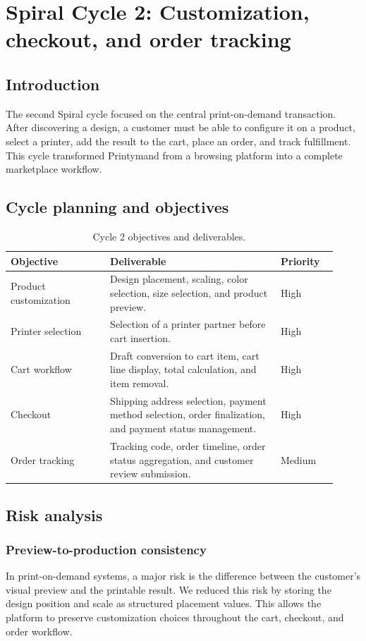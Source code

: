 \chapter{Spiral Cycle 2: Customization, checkout, and order tracking}
\label{ch::chapter5}

\section{Introduction}
The second Spiral cycle focused on the central print-on-demand transaction.
After discovering a design, a customer must be able to configure it on a product, select a printer, add the result to the cart, place an order, and track fulfillment.
This cycle transformed Printymand from a browsing platform into a complete marketplace workflow.

\section{Cycle planning and objectives}
\begin{table}[!htpb]
\caption{Cycle 2 objectives and deliverables.}
\centering
\begin{tabular}{|p{0.28\linewidth}|p{0.48\linewidth}|p{0.16\linewidth}|}
\hline
\textbf{Objective} & \textbf{Deliverable} & \textbf{Priority} \\ \hline
Product customization & Design placement, scaling, color selection, size selection, and product preview. & High \\ \hline
Printer selection & Selection of a printer partner before cart insertion. & High \\ \hline
Cart workflow & Draft conversion to cart item, cart line display, total calculation, and item removal. & High \\ \hline
Checkout & Shipping address selection, payment method selection, order finalization, and payment status management. & High \\ \hline
Order tracking & Tracking code, order timeline, order status aggregation, and customer review submission. & Medium \\ \hline
\end{tabular}
\label{tab:cycle2_objectives}
\end{table}

\section{Risk analysis}
\subsection{Preview-to-production consistency}
In print-on-demand systems, a major risk is the difference between the customer's visual preview and the printable result.
We reduced this risk by storing the design position and scale as structured placement values.
This allows the platform to preserve customization choices throughout the cart, checkout, and order workflow.

